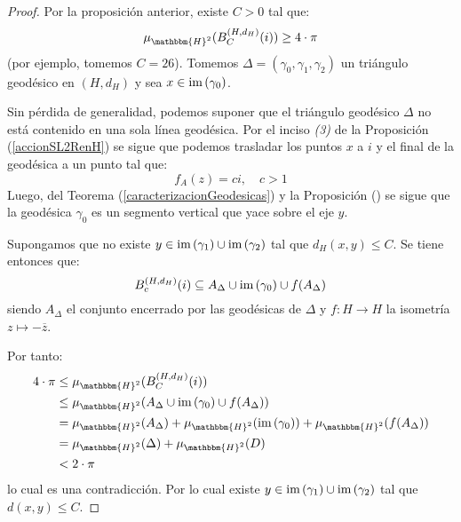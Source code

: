 \documentclass[12pt]{report}
\theoremstyle{largebreak}
\newcommand\cf[3]{\ensuremath{#1:#2\rightarrow#3}}
\newcommand{\bbm}[1]{\ensuremath{\mathbbm{#1}}}
\newcommand{\im}[1]{\ensuremath{\textup{im}\left(#1\right)}}
\begin{document}
    \begin{proof}
        Por la proposición anterior, existe $C>0$ tal que:
        \begin{equation*}
            \mu_{\bbm{H}^2}(B_C^{(H,d_H)}(i))\geq 4\cdot\pi
        \end{equation*}
        (por ejemplo, tomemos $C=26$). Tomemos $\Delta=(\gamma_0,\gamma_1,\gamma_2)$ un triángulo geodésico en $(H,d_H)$ y sea $x\in\im{\gamma_0}$.

        Sin pérdida de generalidad, podemos suponer que el triángulo geodésico $\Delta$ no está contenido en una sola línea geodésica. Por el inciso \textit{(3)} de la Proposición (\ref{accionSL2RenH}) se sigue que podemos trasladar los puntos $x$ a $i$ y el final de la geodésica a un punto tal que:
        \begin{equation*}
            f_A(z)=ci, \quad c>1
        \end{equation*}
        Luego, del Teorema (\ref{caracterizacionGeodesicas}) y la Proposición () se sigue que la geodésica $\gamma_0$ es un segmento vertical que yace sobre el eje $y$.

        Supongamos que no existe $y\in\im{\gamma_1}\cup\im{\gamma_2}$ tal que $d_H(x,y)\leq C$. Se tiene entonces que:
        \begin{equation*}
            B_c^{(H,d_H)}(i)\subseteq A_\Delta\cup\im{\gamma_0}\cup f(A_\Delta)
        \end{equation*}
        siendo $A_\Delta$ el conjunto encerrado por las geodésicas de $\Delta$ y $\cf{f}{H}{H}$ la isometría $z\mapsto-\overline{z}$.


        Por tanto:
        \begin{equation*}
            \begin{split}
                4\cdot\pi&\leq\mu_{\bbm{H}^2}(B_C^{(H,d_H)}(i))\\
                &\leq\mu_{\bbm{H}^2}(A_\Delta\cup\im{\gamma_0}\cup f(A_\Delta))\\
                &=\mu_{\bbm{H}^2}(A_\Delta)+\mu_{\bbm{H}^2}(\im{\gamma_0})+\mu_{\bbm{H}^2}(f(A_\Delta))\\
                &=\mu_{\bbm{H}^2}(\Delta)+\mu_{\bbm{H}^2}(D)\\
                &< 2\cdot\pi\\
            \end{split}
        \end{equation*}
        lo cual es una contradicción. Por lo cual existe $y\in\im{\gamma_1}\cup\im{\gamma_2}$ tal que $d(x,y)\leq C$.


\end{proof}
\end{document}
